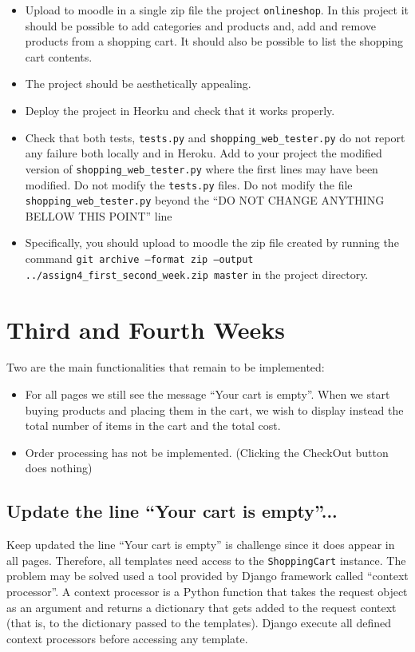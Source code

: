 \documentclass[12pt]{article} %
\newcounter{ejercicioNo}
\newcommand{\ttt}[1]{\texttt{#1}}%
\begin{document}
\begin{minipage}{\linewidth}
\begin{framed}
\addtocounter{ejercicioNo}{1} 

\begin{itemize} 
 \item Upload to moodle in a single zip file the project \texttt{onlineshop}. In this project it should be possible to add categories and products and, add and remove products from a shopping cart. It should also be possible to list the shopping cart contents.
 \item The project should be aesthetically appealing.
 \item Deploy the project in Heorku and check that it works properly.
 \item Check that both tests, \ttt{tests.py} and \ttt{shopping\_web\_tester.py} 
 do not report any failure both locally and in Heroku. Add to your project the modified version of \ttt{shopping\_web\_tester.py} where the first lines may have been modified. Do not modify the \ttt{tests.py} files. Do not modify the file \ttt{shopping\_web\_tester.py} beyond the ``DO NOT CHANGE ANYTHING BELLOW THIS POINT'' line 
 \item Specifically, you should upload to moodle the  zip file created by running the command \texttt{git archive --format zip --output ../assign4\_first\_second\_week.zip  master}
in the project directory.

\end{itemize}
\end{framed}
\end{minipage}
\section{Third and Fourth Weeks}
Two are the main functionalities that remain to be implemented:

\begin{itemize}
 \item For all pages we still see the message ``Your cart is empty''. When we start buying products and placing them   in the cart, we wish to display instead the total number of items in the cart and the total cost. 
 \item Order processing has not be implemented. (Clicking the CheckOut button does nothing) 
\end{itemize}

\subsection{Update the line ``Your cart is empty''...}
Keep updated the line ``Your cart is empty'' is  challenge since it does appear in 
all pages. Therefore, all templates need access to the  \ttt{ShoppingCart} instance. The problem may be solved used a tool provided by Django framework called ``context processor''. A context processor is a Python function that takes the request object as an
argument and returns a dictionary that gets added to the request context (that is, to the dictionary passed to the templates). Django execute all defined context processors before accessing any template.
\end{document}
